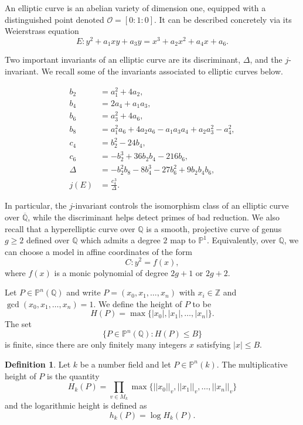 \documentclass{article}
\newcommand{\Q}{\mathbb{Q}}
\newcommand{\Z}{\mathbb{Z}}
\theoremstyle{definition}
\renewcommand{\P}{\mathbb{P}}
\newtheorem{definition}{Definition}
\begin{document}
\noindent An elliptic curve is an abelian variety of dimension one, equipped with a distinguished point denoted $\mathcal{O} = [0:1:0]$. It can be described concretely via its Weierstrass equation
\begin{equation*}
    E \colon y^2 + a_1 xy + a_3 y = x^3 + a_2 x^2 + a_4 x + a_6. 
\end{equation*}

\noindent Two important invariants of an elliptic curve are its discriminant, $\Delta$, and the $j$-invariant. We recall some of the invariants associated to elliptic curves below.

\[
\begin{aligned}
b_2 &= a_1^2 + 4a_2, \\
b_4 &= 2a_4 + a_1 a_3, \\
b_6 &= a_3^2 + 4a_6, \\
b_8 &= a_1^2 a_6 + 4a_2 a_6 - a_1 a_3 a_4 + a_2 a_3^2 - a_4^2, \\
c_4 &= b_2^2 - 24 b_4, \\
c_6 &= -b_2^3 + 36 b_2 b_4 - 216 b_6, \\
\Delta &= -b_2^2 b_8 - 8 b_4^3 - 27 b_6^2 + 9 b_2 b_4 b_6, \\
j(E) &= \frac{c_4^{\,3}}{\Delta}.
\end{aligned}
\]

\noindent In particular, the $j$-invariant controls the isomorphism class of an elliptic curve over $\overline{\Q}$, while the discriminant helps detect primes of bad reduction. We also recall that a hyperelliptic curve over $\Q$ is a smooth, projective curve of genus $g \geq 2$ defined over $\Q$ which admits a degree $2$ map to $\P^1$. Equivalently, over $\Q$, we can choose a model in affine coordinates of the form
$$C \colon y^2 = f(x),$$
where $f(x)$ is a monic polynomial of degree $2g + 1$ or $2g + 2$.

\noindent Let $P \in \P^n(\Q)$ and write $P = (x_0, x_1, \dots, x_n)$ with $x_i \in \Z$ and $\gcd(x_0, x_1, \dots, x_n) = 1$. We define the height of $P$ to be
$$H(P) = \max\{|x_0|, |x_1|, \dots, |x_n|\}.$$
The set 
$$\{P \in \P^n(\Q) : H(P) \leq B\}$$
is finite, since there are only finitely many integers $x$ satisfying $|x| \leq B$. 
\begin{definition}\label{multiplicativeheight}
    Let $k$ be a number field and let $P \in \P^n(k)$. The multiplicative height of $P$ is the quantity
    $$H_k(P) = \prod_{v \in M_k} \max\{||x_0||_v, ||x_1||_v, \dots, ||x_n||_v\}$$
    and the logarithmic height is defined as
    $$h_k(P) = \log H_k(P).$$
\end{definition}
\end{document}
